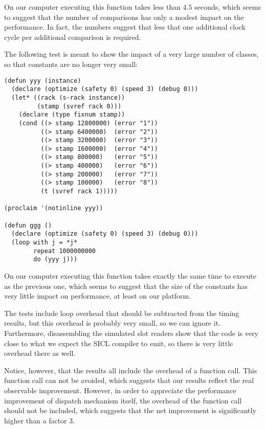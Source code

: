 On our computer executing this function takes less than $4.5$ seconds,
which seems to suggest that the number of comparisons has only a
modest impact on the performance.  In fact, the numbers suggest that
less that one additional clock cycle per additional comparison is
required.

The following test is meant to show the impact of a very large number
of classes, so that constants are no longer very small:

\begin{verbatim}
(defun yyy (instance)
  (declare (optimize (safety 0) (speed 3) (debug 0)))
  (let* ((rack (s-rack instance))
         (stamp (svref rack 0)))
    (declare (type fixnum stamp))
    (cond ((> stamp 12800000) (error "1"))
          ((> stamp 6400000)  (error "2"))
          ((> stamp 3200000)  (error "3"))
          ((> stamp 1600000)  (error "4"))
          ((> stamp 800000)   (error "5"))
          ((> stamp 400000)   (error "6"))
          ((> stamp 200000)   (error "7"))
          ((> stamp 100000)   (error "8"))
          (t (svref rack 1)))))

(proclaim '(notinline yyy))

(defun ggg ()
  (declare (optimize (safety 0) (speed 3) (debug 0)))
  (loop with j = *j*
        repeat 1000000000
        do (yyy j)))
\end{verbatim}

On our computer executing this function takes exactly the same time to
execute as the previous one, which seems to suggest that the size of
the constants has very little impact on performance, at least on our
platform.

The tests include loop overhead that should be subtracted from the
timing results, but this overhead is probably very small, so we can
ignore it.  Furthermore, disassembling the simulated slot readers show
that the code is very close to what we expect the SICL compiler to
emit, so there is very little overhead there as well.  

Notice, however, that the results all include the overhead of a
function call.  This function call can not be avoided, which suggests
that our results reflect the real observable improvement.  However,
in order to appreciate the performance improvement of dispatch
mechanism itself, the overhead of the function call should not be
included, which suggests that the net improvement is significantly
higher than a factor $3$. 



